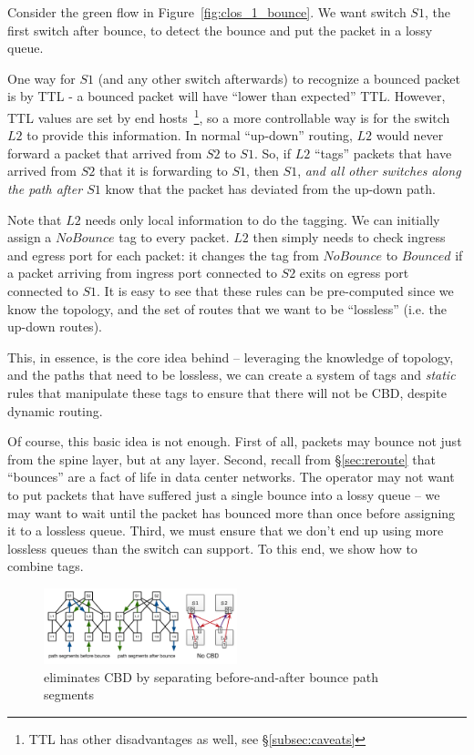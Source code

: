 Consider the green flow in Figure~\ref{fig:clos_1_bounce}.  We want switch $S1$,
the first switch after bounce, to detect the bounce and put the packet in a
lossy queue. 

One way for $S1$ (and any other switch afterwards) to recognize a bounced packet
is by TTL - a bounced packet will have ``lower than expected'' TTL. However, TTL
values are set by end hosts~\footnote{TTL has other disadvantages as well,
see \S\ref{subsec:caveats}}, so a more controllable way is for the switch $L2$
to provide this information.  In normal ``up-down'' routing, $L2$ would never
forward a packet that arrived from $S2$ to $S1$. So, if $L2$ ``tags'' packets
that have arrived from $S2$ that it is forwarding to $S1$, then $S1$, {\em and
all other switches along the path after $S1$} know that the packet has deviated
from the up-down path.

Note that $L2$ needs only local information to do the tagging. We can initially
assign a $NoBounce$ tag to every packet. $L2$ then simply needs to check ingress
and egress port for each packet: it changes the tag from $NoBounce$ to $Bounced$
if a packet arriving from ingress port connected to $S2$ exits on egress port
connected to $S1$.  It is easy to see that these rules can be pre-computed since
we know the topology, and the set of routes that we want to be ``lossless''
(i.e. the up-down routes). 

This, in essence, is the core idea behind \sysname{} -- leveraging the knowledge of
topology, and the paths that need to be lossless, we can create a system of tags
and {\em static} rules that manipulate these tags to ensure that there will not
be CBD, despite dynamic routing.

Of course, this basic idea is not enough. First of all, packets may bounce not
just from the spine layer, but at any layer. Second, recall from
\S\ref{sec:reroute} that ``bounces'' are a fact of life in data center networks.
The operator may not want to put packets that have suffered just a single bounce
into a lossy queue -- we may want to wait until the packet has bounced more than
once before assigning it to a lossless queue. Third, we must ensure that we
don't end up using more lossless queues than the switch can support. To this
end, we show how to combine tags.

\begin{figure}[t]
	\centering
	\includegraphics[width=0.5\textwidth] {figs/cbd_b}
	\caption{\sysname{} eliminates CBD by separating before-and-after bounce path segments}
	\label{fig:clos_tagger}
\end{figure}

